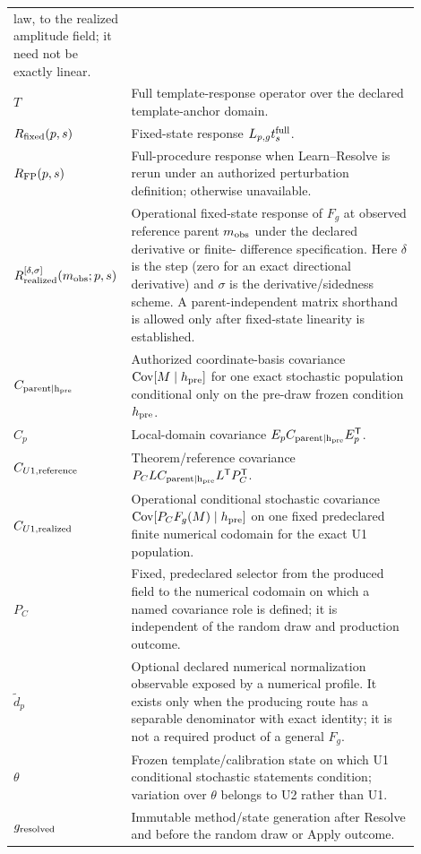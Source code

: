 \begin{longtable}{p{0.20\linewidth}p{0.70\linewidth}}
law, to the realized amplitude field; it need not be exactly linear. \\
$T$ & Full template-response operator over the declared template-anchor domain. \\
$R_{\rm fixed}(p,s)$ & Fixed-state response $L_{p,g}t_s^{\rm full}$. \\
$R_{\rm FP}(p,s)$ & Full-procedure response when Learn--Resolve is rerun under
an authorized perturbation definition; otherwise unavailable. \\
$R_{\rm realized}^{[\delta,\sigma]}(m_{\rm obs};p,s)$ & Operational fixed-state
response of $F_g$ at observed reference parent $m_{\rm obs}$ under the declared derivative or finite-
difference specification. Here $\delta$ is the step (zero for an exact
directional derivative) and $\sigma$ is the derivative/sidedness scheme. A
parent-independent matrix shorthand is allowed only after fixed-state
linearity is established. \\
$C_{\rm parent\mid h_{\rm pre}}$ & Authorized coordinate-basis covariance
$\operatorname{Cov}[M\mid h_{\rm pre}]$ for one exact stochastic population
conditional only on the pre-draw frozen condition $h_{\rm pre}$. \\
$C_p$ & Local-domain covariance
$E_pC_{\rm parent\mid h_{\rm pre}}E_p^{\mathsf T}$. \\
$C_{U1,{\rm reference}}$ & Theorem/reference covariance
$P_CLC_{\rm parent\mid h_{\rm pre}}L^{\mathsf T}P_C^{\mathsf T}$. \\
$C_{U1,{\rm realized}}$ & Operational conditional stochastic covariance
$\operatorname{Cov}[P_CF_g(M)\mid h_{\rm pre}]$ on one fixed predeclared finite
numerical codomain for the exact U1 population. \\
$P_C$ & Fixed, predeclared selector from the produced field to the numerical
codomain on which a named covariance role is defined; it is independent of the
random draw and production outcome. \\
$\widetilde d_p$ & Optional declared numerical normalization observable exposed
by a numerical profile. It exists only when the producing route has a separable
denominator with exact identity; it is not a required product of a general
$F_g$. \\
$\theta$ & Frozen template/calibration state on which U1 conditional stochastic
statements condition; variation over $\theta$ belongs to U2 rather than U1. \\
$g_{\rm resolved}$ & Immutable method/state generation after Resolve and before
the random draw or Apply outcome. \\

\end{longtable}
